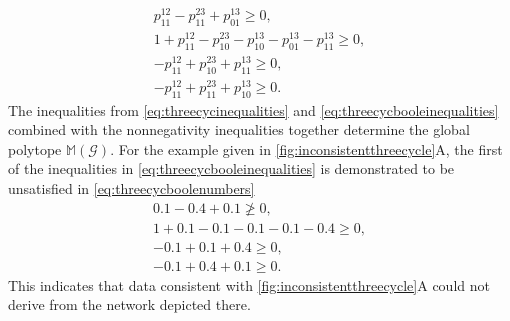 \begin{equation}
\begin{aligned}\label{eq:threecycbooleinequalities}
p^{12}_{11} - p^{23}_{11} + p^{13}_{01} \geq 0, \\
1 + p^{12}_{11} - p^{23}_{10} - p^{13}_{10} - p^{13}_{01} - p^{13}_{11} \geq 0, \\
-p^{12}_{11} + p^{23}_{10} + p^{13}_{11} \geq 0, \\
-p^{12}_{11} + p^{23}_{11} + p^{13}_{10} \geq 0.
\end{aligned}
\end{equation}
The inequalities from \ref{eq:threecycinequalities} and \ref{eq:threecycbooleinequalities} combined with the nonnegativity inequalities together determine the global polytope $\mathbb{M}(\mathcal{G})$. For the example given in \ref{fig:inconsistentthreecycle}A, the first of the inequalities in \ref{eq:threecycbooleinequalities} is demonstrated to be unsatisfied in \ref{eq:threecycboolenumbers}
\begin{equation}
\begin{aligned}\label{eq:threecycboolenumbers}
0.1 - 0.4 + 0.1 \not\geq 0, \\
1 + 0.1 - 0.1 - 0.1 - 0.1 - 0.4 \geq 0, \\
-0.1 + 0.1 + 0.4 \geq 0, \\
-0.1 + 0.4 + 0.1 \geq 0.
\end{aligned}
\end{equation}
This indicates that data consistent with \ref{fig:inconsistentthreecycle}A could not derive from the network depicted there.
